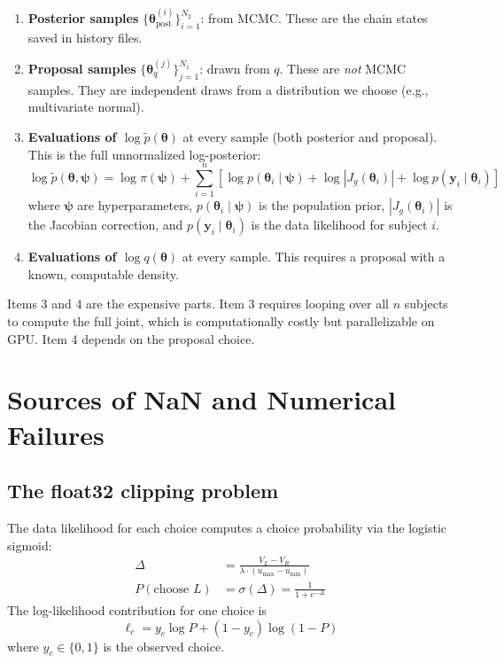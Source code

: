 \documentclass[11pt]{article}
\newcommand{\bth}{\boldsymbol{\theta}}
\newcommand{\bpsi}{\boldsymbol{\psi}}
\newcommand{\by}{\mathbf{y}}
\newcommand{\ptilde}{\tilde{p}}
\theoremstyle{plain}
\theoremstyle{definition}
\begin{document}
\begin{enumerate}
  \item \textbf{Posterior samples}
    $\{\bth^{(i)}_\text{post}\}_{i=1}^{N_2}$: from MCMC. These are the
    chain states saved in history files.

  \item \textbf{Proposal samples}
    $\{\bth^{(j)}_q\}_{j=1}^{N_1}$: drawn from $q$. These are
    \textit{not} MCMC samples. They are independent draws from a
    distribution we choose (e.g., multivariate normal).

  \item \textbf{Evaluations of $\log \ptilde(\bth)$} at every sample (both
    posterior and proposal). This is the full unnormalized log-posterior:
    \begin{equation}
      \label{eq:full_lp}
      \log \ptilde(\bth, \bpsi) = \log \pi(\bpsi)
        + \sum_{i=1}^{n} \left[
          \log p(\bth_i \mid \bpsi) + \log |J_g(\bth_i)| + \log p(\by_i \mid \bth_i)
        \right]
    \end{equation}
    where $\bpsi$ are hyperparameters, $p(\bth_i \mid \bpsi)$ is the
    population prior, $|J_g(\bth_i)|$ is the Jacobian correction, and
    $p(\by_i \mid \bth_i)$ is the data likelihood for subject $i$.

  \item \textbf{Evaluations of $\log q(\bth)$} at every sample. This requires
    a proposal with a known, computable density.
\end{enumerate}

Items 3 and 4 are the expensive parts. Item 3 requires looping over all $n$
subjects to compute the full joint, which is computationally costly but
parallelizable on GPU. Item 4 depends on the proposal choice.


\section{Sources of NaN and Numerical Failures}

\subsection{The float32 clipping problem}

The data likelihood for each choice computes a choice probability via the
logistic sigmoid:
\begin{align}
  \Delta &= \frac{V_L - V_R}{\lambda \cdot (u_{\max} - u_{\min})} \\
  P(\text{choose } L) &= \sigma(\Delta) = \frac{1}{1 + e^{-\Delta}}
\end{align}
The log-likelihood contribution for one choice is
\begin{equation}
  \label{eq:choice_ll}
  \ell_c = y_c \log P + (1 - y_c) \log(1 - P)
\end{equation}
where $y_c \in \{0, 1\}$ is the observed choice.
\end{document}

